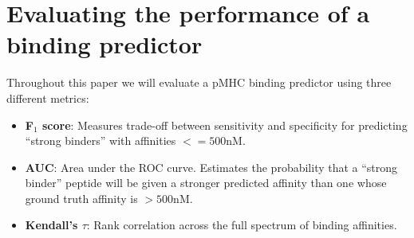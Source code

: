 

\section{Evaluating the performance of a binding predictor}

Throughout this paper we will evaluate a pMHC binding predictor using three different metrics:

\begin{itemize}

\item {\bf F$_1$ score}: Measures trade-off between sensitivity and specificity for predicting ``strong binders'' with affinities $<= 500$nM. 
\item {\bf AUC}: Area under the ROC curve. Estimates the probability that a ``strong binder'' peptide will be given a stronger predicted affinity than one whose ground truth affinity is $>500$nM. 
\item {\bf Kendall's $\tau$}: Rank correlation across the full spectrum of binding affinities.
\end{itemize}

